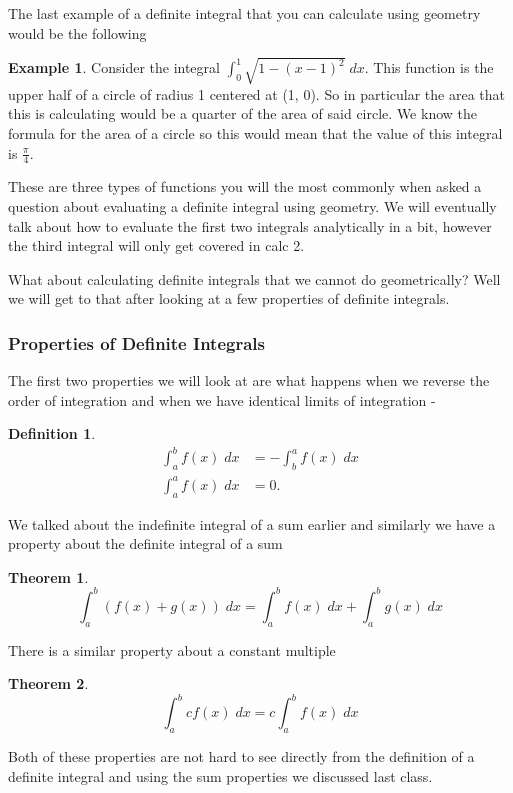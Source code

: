 \documentclass[12pt,reqno]{article}
\newtheorem{Theorem}{Theorem}
\theoremstyle{definition}
\newtheorem*{Definition}{Definition}
\newtheorem*{Example}{Example}
\begin{document}
The last example of a definite integral that you can calculate using geometry would be the following 
\begin{Example}
	Consider the integral $\int_{0}^{1} \sqrt{1 - (x - 1)^2} \; dx$. This function is the upper half of a circle of radius 1 centered at (1, 0). So in particular the area that this is calculating would be a quarter of the area of said circle. We know the formula for the area of a circle so this would mean that the value of this integral is $\frac{\pi}{4}$. 
\end{Example}

These are three types of functions you will the most commonly when asked a question about evaluating a definite integral using geometry. We will eventually talk about how to evaluate the first two integrals analytically in a bit, however the third integral will only get covered in calc 2. 

What about calculating definite integrals that we cannot do geometrically? Well we will get to that after looking at a few properties of definite integrals. 

\subsubsection{Properties of Definite Integrals}

The first two properties we will look at are what happens when we reverse the order of integration and when we have identical limits of integration - 
\begin{Definition}
	\begin{align}
		\int_{a}^{b} f(x) \; dx &= - \int_{b}^{a} f(x) \; dx \\
		\int_{a}^{a} f(x) \; dx &= 0.
	\end{align}
\end{Definition}


We talked about the indefinite integral of a sum earlier and similarly we have a property about the definite integral of a sum 
\begin{Theorem}
	$$\int_{a}^{b} (f(x) + g(x)) \;dx = \int_{a}^{b} f(x) \; dx + \int_{a}^{b} g(x) \; dx$$
\end{Theorem}

There is a similar property about a constant multiple
\begin{Theorem}
	$$\int_{a}^{b} c f(x) \; dx = c \int_{a}^{b} f(x) \; dx$$
\end{Theorem}

Both of these properties are not hard to see directly from the definition of a definite integral and using the sum properties we discussed last class. 
\end{document}
